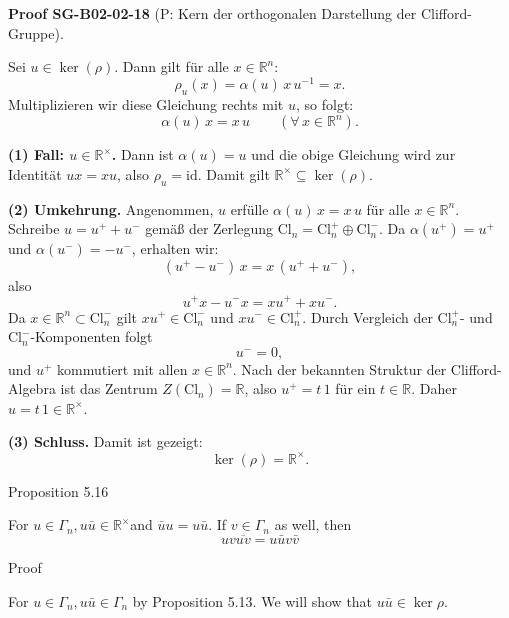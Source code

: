 \documentclass[10pt, letterpaper]{article}
\newcommand{\R}{\mathbb{R}}
\newcommand{\Cl}{\mathrm{Cl}}
\newcommand{\CustomHeading}[3]{%
  \par\medskip\noindent%
  \textbf{#1 #2} \textnormal{(#3)}.\enskip%
}
\newenvironment{PROOF}[2]{\begin{unitbox}\CustomHeading{Proof}{#1}{#2}}{\end{unitbox}}
\begin{document}
\begin{PROOF}{SG-B02-02-18}{P: Kern der orthogonalen Darstellung der Clifford-Gruppe}
Sei \(u \in \ker(\rho)\). Dann gilt für alle \(x \in \R^n\):
\[
\rho_u(x) = \alpha(u)\,x\,u^{-1} = x.
\]
Multiplizieren wir diese Gleichung rechts mit \(u\), so folgt:
\[
\alpha(u)\,x = x\,u \qquad (\forall\,x \in \R^n).
\]

\textbf{(1) Fall: \(u \in \R^\times\).}  
Dann ist \(\alpha(u)=u\) und die obige Gleichung wird zur Identität
\(u x = x u\), also \(\rho_u = \mathrm{id}\).  
Damit gilt \(\R^\times \subseteq \ker(\rho)\).

\textbf{(2) Umkehrung.}  
Angenommen, \(u\) erfülle \(\alpha(u)\,x = x\,u\) für alle \(x \in \R^n\).
Schreibe \(u = u^+ + u^-\) gemäß der Zerlegung
\(\Cl_n = \Cl_n^+ \oplus \Cl_n^-\).
Da \(\alpha(u^+) = u^+\) und \(\alpha(u^-) = -u^-\), erhalten wir:
\[
(u^+ - u^-)\,x = x\,(u^+ + u^-),
\]
also
\[
u^+x - u^-x = x u^+ + x u^-.
\]
Da \(x \in \R^n \subset \Cl_n^-\) gilt \(x u^+ \in \Cl_n^-\) und \(x u^- \in \Cl_n^+\).
Durch Vergleich der \(\Cl_n^+\)- und \(\Cl_n^-\)-Komponenten folgt
\[
u^- = 0,
\]
und \(u^+\) kommutiert mit allen \(x \in \R^n\).
Nach der bekannten Struktur der Clifford-Algebra ist das Zentrum
\(Z(\Cl_n) = \R\), also \(u^+ = t\,1\) für ein \(t \in \R\).
Daher \(u = t\,1 \in \R^\times\).

\textbf{(3) Schluss.}  
Damit ist gezeigt:
\[
\ker(\rho) = \R^\times.
\]
\end{PROOF}



Proposition 5.16


For $u \in \Gamma_{n}, u \bar{u} \in \mathbb{R}^{\times}$and $\bar{u} u=u \bar{u}$. If $v \in \Gamma_{n}$ as well, then
$$
u v \overline{u v}=u \bar{u} v \bar{v}
$$


Proof

For $u \in \Gamma_{n}, u \bar{u} \in \Gamma_{n}$ by Proposition 5.13. We will show that $u \bar{u} \in \operatorname{ker} \rho$.
\end{document}
